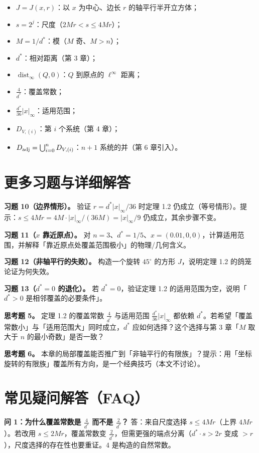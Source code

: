 \documentclass[a4paper,11pt,openany]{ctexbook}
\numberwithin{equation}{chapter}
\numberwithin{figure}{chapter}
\numberwithin{table}{chapter}
\begin{document}
\begin{itemize}
\item $J=J(x,r)$：以 $x$ 为中心、边长 $r$ 的轴平行半开立方体；
\item $s=2^j$：尺度（$2Mr<s\le4Mr$）；
\item $M=1/d^*$：模（$M$ 奇、$M>n$）；
\item $d^*$：相对距离（第 3 章）；
\item $\operatorname{dist}_\infty(Q,0)$：$Q$ 到原点的 $\ell^\infty$ 距离；
\item $\frac4{d^*}$：覆盖常数；
\item $\frac{d^*}{36}|x|_\infty$：适用范围；
\item $D_{V,(i)}$：第 $i$ 个系统（第 4 章）；
\item $D_{\rm adj}=\bigcup_{i=0}^n D_{V,(i)}$：$n+1$ 系统的并（第 6 章引入）。
\end{itemize}

\section{更多习题与详细解答}

\textbf{习题 10（边界情形）。} 验证 $r=d^*|x|_\infty/36$ 时定理 1.2 仍成立（等号情形）。提示：$s\le4Mr=4M\cdot|x|_\infty/(36M)=|x|_\infty/9$ 仍成立，其余步骤不变。

\textbf{习题 11（$x$ 靠近原点）。} 对 $n=3$、$d^*=1/5$、$x=(0.01,0,0)$，计算适用范围，并解释「靠近原点处覆盖范围极小」的物理/几何含义。

\textbf{习题 12（非轴平行的失败）。} 构造一个旋转 $45^\circ$ 的方形 $J$，说明定理 1.2 的鸽笼论证为何失效。

\textbf{习题 13（$d^*=0$ 的退化）。} 若 $d^*=0$，验证定理 1.2 的适用范围为空，说明「$d^*>0$ 是相邻覆盖的必要条件」。

\textbf{思考题 5。} 定理 1.2 的覆盖常数 $\frac4{d^*}$ 与适用范围 $\frac{d^*}{36}|x|_\infty$ 都依赖 $d^*$。若希望「覆盖常数小」与「适用范围大」同时成立，$d^*$ 应如何选择？这个选择与第 3 章「$M$ 取大于 $n$ 的最小奇数」是否一致？

\textbf{思考题 6。} 本章的局部覆盖能否推广到「非轴平行的有限族」？提示：用「坐标旋转的有限族」覆盖所有方向，是一个经典技巧（本文不讨论）。

\section{常见疑问解答（FAQ）}

\textbf{问 1：为什么覆盖常数是 $\frac4{d^*}$ 而不是 $\frac2{d^*}$？} 答：来自尺度选择 $s\le4Mr$（上界 $4Mr$）。若改用 $s\le2Mr$，覆盖常数变 $\frac2{d^*}$，但需更强的端点分离（$d^*\cdot s>2r$ 变成 $>r$），尺度选择的存在性也要重证。$4$ 是构造的自然常数。
\end{document}
